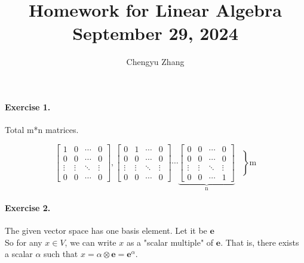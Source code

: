 \documentclass{article}
\title{\vspace*{-3.5cm}Homework for Linear Algebra \\September 29, 2024}
\author{Chengyu Zhang}
\date{}
\begin{document}
\maketitle

\paragraph{Exercise 1.}Total m*n matrices.

  \[
          \begin{bmatrix}
            1 & 0 &\cdots & 0\\
            0 & 0 &\cdots & 0\\
            \vdots & \vdots & \ddots & \vdots\\
            0 & 0 &\cdots & 0
          \end{bmatrix},
          \begin{bmatrix}
            0 & 1 &\cdots & 0\\
            0 & 0 &\cdots & 0\\
            \vdots & \vdots & \ddots & \vdots\\
            0 & 0 &\cdots & 0
          \end{bmatrix}
          \cdots 
          \underbrace{
          \begin{bmatrix}
            0 & 0 &\cdots & 0\\
            0 & 0 &\cdots & 0\\
            \vdots & \vdots & \ddots & \vdots\\
            0 & 0 &\cdots &1
          \end{bmatrix}
        }_{\text{n}}
        \left.
        \begin{array}{c}
        \\
        \\
        \\
        \\
        \\
        \end{array}
        \right\}{\text{m}}
  \]

  \paragraph{Exercise 2.} The given vector space has one basis element. Let it be $\mathbf{e}$\\
  So for any $x\in V$, we can write $x$ as a "scalar multiple" of $\mathbf{e}$. That is, there exists a scalar $\alpha$ such that $x = \alpha\otimes\mathbf{e}=\mathbf{e}^\alpha$.
\end{document}
